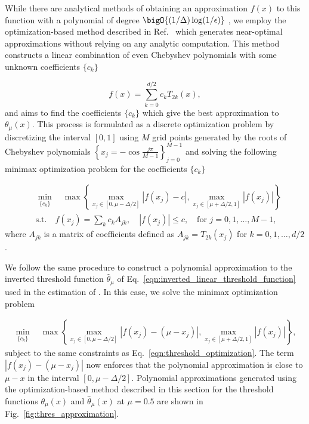 \begin{enumerate}
While there are analytical methods of obtaining an approximation $f(x)$ to this function with a polynomial of degree $\bigO{(1/\Delta)\log(1/\epsilon)}$ \cite{low2017hamiltonian}, we employ the optimization-based method described in Ref.~\cite{dong2022ground} which generates near-optimal approximations without relying on any analytic computation.
This method constructs a linear combination of even Chebyshev polynomials with some unknown coefficients $\{c_k\}$

\begin{equation}
	f(x)=\sum_{k=0}^{d/2}c_kT_{2k}(x),
\end{equation}
and aims to find the coefficients $\{c_k\}$ which give the best approximation to $\theta_{\mu}(x)$.
This process is formulated as a discrete optimization problem by discretizing the interval $[0, 1]$ using $M$ grid points generated by the roots of Chebyshev polynomials $\left\{x_j = -\cos\frac{j\pi}{M-1}\right\}_{j=0}^{M-1}$ and solving the following minimax optimization problem for the coefficients $\{c_k\}$

\begin{eqnarray}
	\label{eqn:threshold_optimization}
	&\underset{\{c_k\}}{\min} \quad \max \left\{ \underset{x_j \in [0, \mu-\Delta/2]}{\max} |f(x_j)-c|, \underset{x_j \in [\mu + \Delta/2, 1]}{\max} |f(x_j)| \right\} \nonumber \\
	& \textrm{s.t.} \quad f(x_j)=\sum_k c_kA_{jk}, \quad |f(x_j)| \le c, \quad \textrm{for } j=0, 1, \ldots, M-1,
\end{eqnarray}
where $A_{jk}$ is a matrix of coefficients defined as $A_{jk}=T_{2k}(x_j)$ for $k=0, 1, \ldots, d/2$.


We follow the same procedure to construct a polynomial approximation to the inverted threshold function $\hat{\theta}_{\mu}$ of Eq.~\eqref{eqn:inverted_linear_threshold_function} used in the estimation of \cvar{}.
In this case, we solve the minimax optimization problem

\begin{eqnarray}
	\label{eqn:linear_threshold_optimization}
	\underset{\{c_k\}}{\min} \quad \max \left\{ \underset{x_j \in [0, \mu-\Delta/2]}{\max} |f(x_j)-(\mu - x_j)|, \underset{x_j \in [\mu + \Delta/2, 1]}{\max} |f(x_j)| \right\},
\end{eqnarray}
subject to the same constraints as Eq.~\eqref{eqn:threshold_optimization}.
The term $|f(x_j)-(\mu - x_j)|$ now enforces that the polynomial approximation is close to $\mu-x$ in the interval $[0, \mu-\Delta/2]$.
Polynomial approximations generated using the optimization-based method described in this section for the threshold functions $\theta_{\mu}(x)$ and $\hat{\theta}_{\mu}(x)$ at $\mu=0.5$ are shown in Fig.~\ref{fig:thres_approximation}.


\end{enumerate}
